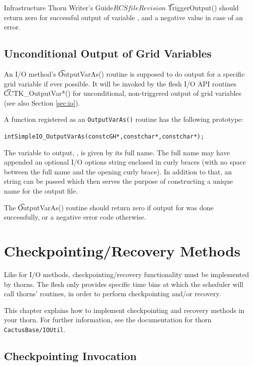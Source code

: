 \begin{cactuspart}{Infrastructure Thorn Writer's Guide}{$RCSfile$}{$Revision$}
{\t TriggerOutput()} should return zero for successful output of variable
\texttt{}, and a negative value in case of an error.
%
%
\section{Unconditional Output of Grid Variables}

An I/O method's {\t OutputVarAs()} routine is supposed to do output for a
specific grid variable if ever possible. It will be invoked by the flesh I/O API
routines {\t CCTK\_OutputVar*()} for unconditional, non-triggered output of
grid variables (see also Section \ref{sec:io}).

A function registered as an \texttt{OutputVarAs()} routine has the following
prototype:
%
\begin{alltt}
  int SimpleIO_OutputVarAs (const cGH *, const char *, const char *);
\end{alltt}
%
The variable to output, \texttt{}, is given by its full name.
The full name may have appended an optional I/O options string enclosed in
curly braces (with no space between the full name and the opening curly brace).
In addition to that, an \texttt{} string can be passed which then
serves the purpose of constructing a unique name for the output file.

The {\t OutputVarAs()} routine should return zero if output for
\texttt{}
was done successfully, or a negative error code otherwise.


\chapter{Checkpointing/Recovery Methods}
\label{chap:cp_recovery_methods}

Like for I/O methods, checkpointing/recovery functionality must be implemented
by thorns. The flesh only provides specific time bins at which the scheduler
will call thorns' routines, in order to perform checkpointing and/or recovery.

This chapter explains how to implement checkpointing and recovery methods
in your thorn.  For further information, see the documentation for thorn
\texttt{CactusBase/IOUtil}.

\section{Checkpointing Invocation}


\end{cactuspart}

